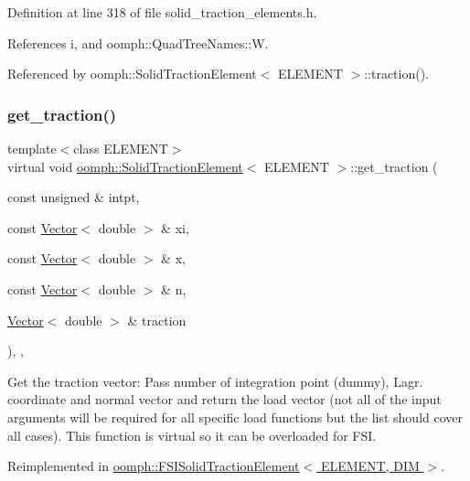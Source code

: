 Definition at line 318 of file solid\+\_\+traction\+\_\+elements.\+h.



References i, and oomph\+::\+Quad\+Tree\+Names\+::W.



Referenced by oomph\+::\+Solid\+Traction\+Element$<$ E\+L\+E\+M\+E\+N\+T $>$\+::traction().

\mbox{\label{classoomph_1_1SolidTractionElement_ace61448de38dc67cbc0f7b42ed743eff}} 
\subsubsection{\texorpdfstring{get\+\_\+traction()}{get\_traction()}}
{\footnotesize\ttfamily template$<$class E\+L\+E\+M\+E\+NT$>$ \\
virtual void \hyperlink{classoomph_1_1SolidTractionElement}{oomph\+::\+Solid\+Traction\+Element}$<$ E\+L\+E\+M\+E\+NT $>$\+::get\+\_\+traction (\begin{DoxyParamCaption}\item[{const unsigned \&}]{intpt,  }\item[{const \hyperlink{classoomph_1_1Vector}{Vector}$<$ double $>$ \&}]{xi,  }\item[{const \hyperlink{classoomph_1_1Vector}{Vector}$<$ double $>$ \&}]{x,  }\item[{const \hyperlink{classoomph_1_1Vector}{Vector}$<$ double $>$ \&}]{n,  }\item[{\hyperlink{classoomph_1_1Vector}{Vector}$<$ double $>$ \&}]{traction }\end{DoxyParamCaption})\hspace{0.3cm}{\ttfamily [inline]}, {\ttfamily [protected]}, {\ttfamily [virtual]}}



Get the traction vector\+: Pass number of integration point (dummy), Lagr. coordinate and normal vector and return the load vector (not all of the input arguments will be required for all specific load functions but the list should cover all cases). This function is virtual so it can be overloaded for F\+SI. 



Reimplemented in \hyperlink{classoomph_1_1FSISolidTractionElement_a861d9e1c8358c02f304e90c0d16a050d}{oomph\+::\+F\+S\+I\+Solid\+Traction\+Element$<$ E\+L\+E\+M\+E\+N\+T, D\+I\+M $>$}.




